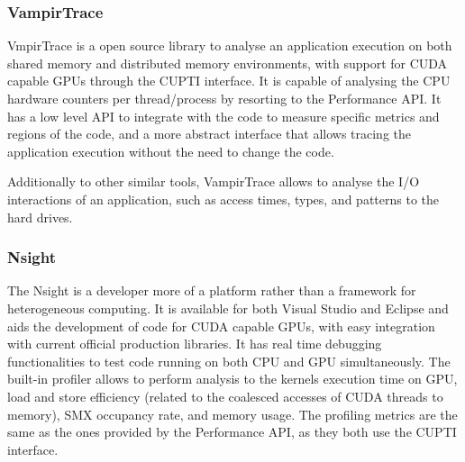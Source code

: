 \subsubsection*{VampirTrace}

VmpirTrace \cite{VampirTrace} is a open source library to analyse an application execution on both shared memory and distributed memory environments, with support for CUDA capable GPUs through the CUPTI interface. It is capable of analysing the CPU hardware counters per thread/process by resorting to the Performance API. It has a low level API to integrate with the code to measure specific metrics and regions of the code, and a more abstract interface that allows tracing the application execution without the need to change the code.

Additionally to other similar tools, VampirTrace allows to analyse the I/O interactions of an application, such as access times, types, and patterns to the hard drives.

\subsubsection*{\nvidia Nsight}

The \nvidia Nsight \cite{NVIDIA:Nsight} is a developer more of a platform rather than a framework for heterogeneous computing. It is available for both Visual Studio and Eclipse and aids the development of code for CUDA capable GPUs, with easy integration with current official production libraries. It has real time debugging functionalities to test code running on both CPU and GPU simultaneously. The built-in profiler allows to perform analysis to the kernels execution time on GPU, load and store efficiency (related to the coalesced accesses of CUDA threads to memory), SMX occupancy rate, and memory usage. The profiling metrics are the same as the ones provided by the Performance API, as they both use the \nvidia CUPTI interface.
